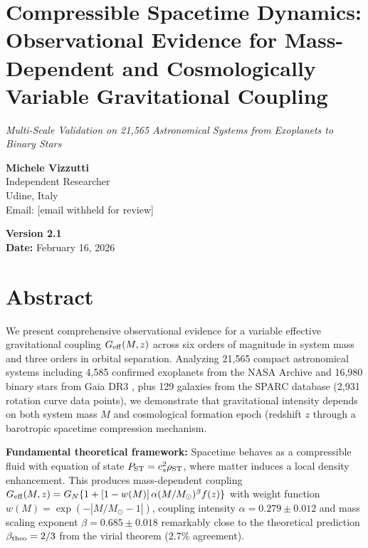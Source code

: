\documentclass[10pt,a4paper]{article}
\begin{document}
\sloppy  %

\section*{Compressible Spacetime Dynamics: Observational Evidence for
Mass-Dependent and Cosmologically Variable Gravitational
Coupling}\label{compressible-spacetime-dynamics-observational-evidence-for-mass-dependent-and-cosmologically-variable-gravitational-coupling}

{\large\textit{Multi-Scale Validation on 21,565 Astronomical Systems from Exoplanets to Binary Stars}}\label{multi-scale-validation-on-21565-astronomical-systems-from-exoplanets-to-binary-stars}

\textbf{Michele Vizzutti}\\
Independent Researcher\\
Udine, Italy\\
Email: [email withheld for review]

\textbf{Version 2.1}\\
\textbf{Date:} February 16, 2026

\section*{Abstract}\label{abstract}

We present comprehensive observational evidence for a variable effective
gravitational coupling \(G_{\rm eff}(M,z)\) across six orders of
magnitude in system mass and three orders in orbital separation.
Analyzing 21,565 compact astronomical systems including 4,585 confirmed
exoplanets from the NASA Archive and 16,980 binary stars from Gaia DR3 \cite{GaiaCollaboration2023a,GaiaCollaboration2023b,GaiaCollaboration2023c},
plus 129 galaxies from the SPARC database (2,931 rotation curve data points),
we demonstrate that gravitational intensity depends on both system mass
\(M\) and cosmological formation epoch (redshift \(z\) through a
barotropic spacetime compression mechanism.

\textbf{Fundamental theoretical framework:} Spacetime behaves as a
compressible fluid with equation of state
\(P_{\rm ST} = c_s^2 \rho_{\rm ST}\), where matter induces a local
density enhancement. This produces mass-dependent coupling
\(G_{\rm eff}(M,z) = G_N\{1 + [1-w(M)]\,\alpha(M/M_\odot)^\beta f(z)\}\)
with weight function \(w(M) = \exp(-|M/M_\odot - 1|)\), coupling
intensity \(\alpha = 0.279 \pm 0.012\) and mass scaling exponent
\(\beta = 0.685 \pm 0.018\) remarkably close to the theoretical
prediction \(\beta_{\rm theo} = 2/3\) from the virial theorem (2.7\%
agreement).
\end{document}
